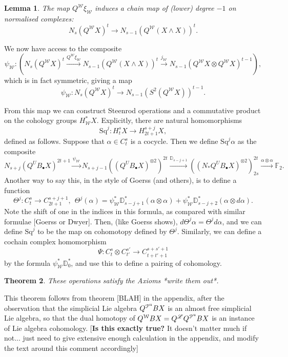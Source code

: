 \documentclass[11pt]{amsart}
\theoremstyle{plain}
\newtheorem{thm}{Theorem}[section]
\newtheorem{lem}[thm]{Lemma}
\theoremstyle{definition}
\renewcommand{\to}{\longrightarrow}
\newcommand{\scrL}{\mathscr{L}}
\newcommand{\calW}{\mathcal{W}}
\newcommand{\calP}{\mathcal{P}}
\newcommand{\calV}{\mathcal{V}}
\theoremstyle{plain}
\newcommand{\PMonad}{{\calP^\textup{u}}}
\newcommand{\Palg}{{\calP}}
\newcommand{\LieOperad}{{\scrL}}
\newcommand{\vect}[2]{\calV^{#1}_{#2}}
\newcommand{\Sq}{\mathrm{Sq}}
\newcommand{\F}{\mathbb{F}}
\begin{document}
\begin{Cohomology operations for unstable Lie algebras over P}
{\begin{lem}
The map $Q^\calW\xi_\calW$ induces a chain map of (lower) degree $-1$ on normalised complexes:
\[N_s(Q^{\calW}X)^t\to N_{s-1}(Q^{\calW}(X\wedge X))^t.\]
\end{lem}
We now have access to the composite
\[\psi_\calW:\left(N_s(Q^{\calW}X)^t\overset{Q^\calW\xi_\calW}{\to} N_{s-1}(Q^{\calW}(X\wedge X))^t\overset{j_\calW}{\to} N_{s-1}(Q^{\calW}X\otimes Q^\calW X)^{t-1}\right),\]
which is in fact symmetric, giving a map
\[\psi_{\calW}:N_s(Q^{\calW}X)^t\to N_{s-1}(S^2(Q^{\calW}X))^{t-1}.\]

From this map we can construct Steenrod operations and a commutative product on the cohology groups $H^*_\calW X$. Explicitly, there are natural homomorphisms
\[\Sq^j:H_t^{s}X\to H_{2t+1}^{s+j}X,\]
defined as follows. Suppose that $\alpha\in C_t^{s}$ is a cocycle. Then we define $\Sq^j\alpha$ as the composite
\[N_{s+j}(Q^UB_{\bullet}X)^{2t+1}\overset{\psi_\calW}{\to}N_{s+j-1}((Q^UB_{\bullet}X)^{\otimes2})^{2t}\overset{\mathbb{D}_{s-j+1}}{\to}
((N_*Q^UB_{\bullet}X)^{\otimes2})^{2t}_{2s} \overset{\alpha\otimes\alpha}{\to}\F_2.
\]
Another way to say this, in the style of Goerss (and others), is to define a function
\[\Theta^j:C_{t}^{s}\to C_{2t+1}^{s+j+1},\ \ \Theta^j(\alpha)=\psi^*_\calW\mathbb{D}_{s-j+1}^*(\alpha\otimes\alpha)+ \psi^*_\calW\mathbb{D}_{s-j+2}^*(\alpha\otimes d\alpha).\]
Note the shift of one in the indices in this formula, as compared with similar formulae [Goerss or Dwyer].
Then, (like Goerss shows), $d\Theta^j\alpha=\Theta^jd\alpha$, and we can define $\Sq^j$ to be the map on cohomotopy defined by $\Theta^j$. Similarly, we can define a cochain complex homomorphism
\[\Psi:C_t^{s}\otimes C_{t'}^{s'}\to C_{t+t'+1}^{s+s'+1}\]
by the formula $\psi^*_\calW\mathbb{D}_0^*$, and use this to define a pairing of cohomology.}
\begin{thm}
These operations satisfy the Axioms *write them out*.
\end{thm}
This theorem follows from theorem [BLAH] in the appendix, after the observation that 
the simplicial Lie algebra $Q^\PMonad B X$ is an almost free simplicial Lie algebra, so that the dual homotopy of $Q^\calW B X=Q^{\LieOperad} Q^\PMonad B X$ is an instance of Lie algebra cohomology. [\textbf{Is this exactly true?} It doesn't matter much if not... just need to give extensive enough calculation in the appendix, and modify the text around this comment accordingly]


\end{Cohomology operations for unstable Lie algebras over P}
\end{document}
